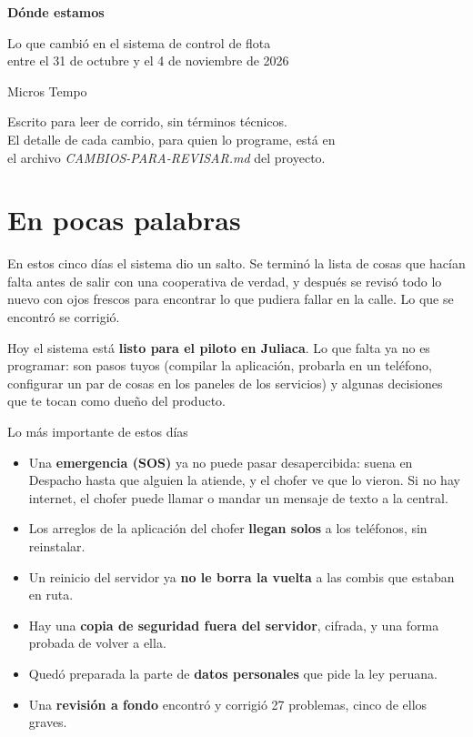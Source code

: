 \documentclass[12pt,a4paper]{article}
\begin{document}
\begin{titlepage}
  \centering
  \vspace*{4cm}
  {\Huge\bfseries Dónde estamos\par}
  \vspace{0.8cm}
  {\Large Lo que cambió en el sistema de control de flota\\
  entre el 31 de octubre y el 4 de noviembre de 2026\par}
  \vspace{2.5cm}
  {\large Micros Tempo\par}
  \vfill
  {\normalsize Escrito para leer de corrido, sin términos técnicos.\\
  El detalle de cada cambio, para quien lo programe, está en\\
  el archivo \emph{CAMBIOS-PARA-REVISAR.md} del proyecto.\par}
  \vspace{1cm}
\end{titlepage}

\section{En pocas palabras}

En estos cinco días el sistema dio un salto. Se terminó la lista de cosas
que hacían falta antes de salir con una cooperativa de verdad, y después se
revisó todo lo nuevo con ojos frescos para encontrar lo que pudiera fallar
en la calle. Lo que se encontró se corrigió.

Hoy el sistema está \textbf{listo para el piloto en Juliaca}. Lo que falta
ya no es programar: son pasos tuyos (compilar la aplicación, probarla en un
teléfono, configurar un par de cosas en los paneles de los servicios) y
algunas decisiones que te tocan como dueño del producto.

\begin{recuadro}{Lo más importante de estos días}
\begin{itemize}[leftmargin=1.2em]
  \item Una \textbf{emergencia (SOS)} ya no puede pasar desapercibida: suena
  en Despacho hasta que alguien la atiende, y el chofer ve que lo vieron.
  Si no hay internet, el chofer puede llamar o mandar un mensaje de texto
  a la central.
  \item Los arreglos de la aplicación del chofer \textbf{llegan solos} a los
  teléfonos, sin reinstalar.
  \item Un reinicio del servidor ya \textbf{no le borra la vuelta} a las
  combis que estaban en ruta.
  \item Hay una \textbf{copia de seguridad fuera del servidor}, cifrada, y una
  forma probada de volver a ella.
  \item Quedó preparada la parte de \textbf{datos personales} que pide la ley
  peruana.
  \item Una \textbf{revisión a fondo} encontró y corrigió 27 problemas, cinco
  de ellos graves.
\end{itemize}
\end{recuadro}
\end{document}
